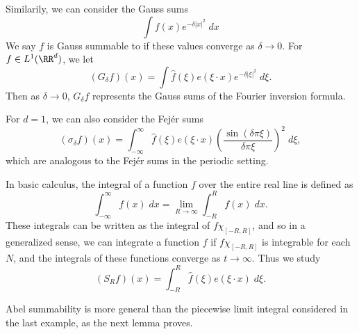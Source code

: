 \begin{example}
    Similarily, we can consider the Gauss sums
    \[ \int f(x) e^{-\delta |x|^2}\; dx \]
    We say $f$ is Gauss summable to if these values converge as $\delta \to 0$. For $f \in L^1(\RR^d)$, we let
    \[ (G_\delta f)(x) = \int \widehat{f}(\xi) e(\xi \cdot x) e^{-\delta |\xi|^2}\; d\xi. \]
    Then as $\delta \to 0$, $G_\delta f$ represents the Gauss sums of the Fourier inversion formula.
\end{example}

\begin{example}
    For $d = 1$, we can also consider the Fej\'{e}r sums
    \[ (\sigma_\delta f)(x) = \int_{-\infty}^\infty \widehat{f}(\xi) e(\xi \cdot x) \left( \frac{\sin(\delta \pi \xi)}{\delta \pi \xi} \right)^2\; d\xi, \]
    which are analogous to the Fej\'{e}r sums in the periodic setting.
\end{example}

\begin{example}
    In basic calculus, the integral of a function $f$ over the entire real line is defined as
    \[ \int_{-\infty}^\infty f(x)\; dx = \lim_{R \to \infty} \int_{-R}^R f(x)\; dx. \]
    These integrals can be written as the integral of $f \chi_{[-R,R]}$, and so in a generalized sense, we can integrate a function $f$ if $f \chi_{[-R,R]}$ is integrable for each $N$, and the integrals of these functions converge as $t \to \infty$. Thus we study
    \[ (S_R f)(x) = \int_{-R}^R \widehat{f}(\xi) e(\xi \cdot x)\; d\xi. \]
\end{example}

Abel summability is more general than the piecewise limit integral considered in the last example, as the next lemma proves.

